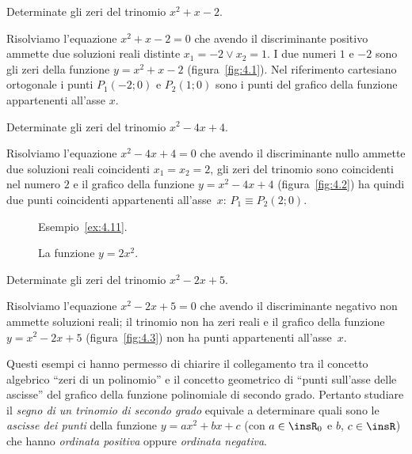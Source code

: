 \begin{exrig}
\begin{esempio}
\label{ex:4.9}
Determinate gli zeri del trinomio $x^2+x-2$.

Risolviamo l'equazione $x^2+x-2=0$ che avendo il discriminante positivo ammette due soluzioni reali distinte $x_1=-2\vee x_2=1$. I due numeri $1$ e $-2$ sono gli zeri della funzione $y=x^2+x-2$ (figura~\ref{fig:4.1}). Nel riferimento cartesiano ortogonale i punti $P_1(-2;0)$ e $P_2(1;0)$ sono i punti del grafico della funzione appartenenti all'asse $x$.
\end{esempio}

\begin{esempio}
\label{ex:4.10}
Determinate gli zeri del trinomio $x^2-4x+4$.

Risolviamo l'equazione $x^2-4x+4=0$ che avendo il discriminante nullo ammette due soluzioni reali coincidenti $x_1=x_2=2$, gli zeri del trinomio sono coincidenti nel numero $2$ e il grafico della funzione $y=x^2-4x+4$  (figura~\ref{fig:4.2}) ha quindi due punti coincidenti appartenenti all'asse~$x$: $P_1\equiv P_2(2;0)$.
\end{esempio}
\pagebreak
\begin{figure}[b]
 \begin{minipage}[t]{.45\textwidth}
\centering
 
\caption{Esempio~\ref{ex:4.11}.}\label{fig:4.3}
 \end{minipage}\hfil
 \begin{minipage}[t]{.45\textwidth}
\centering
 
\caption{La funzione $y=2x^2$.}\label{fig:4.4}
 \end{minipage}
\end{figure}

\begin{esempio}
\label{ex:4.11}
Determinate gli zeri del trinomio $x^2-2x+5$.

Risolviamo l'equazione $x^2-2x+5=0$ che avendo il discriminante negativo non ammette soluzioni reali; il trinomio non ha zeri reali e il grafico della funzione $y=x^2-2x+5$ (figura~\ref{fig:4.3}) non ha punti appartenenti all'asse~$x$.
\end{esempio}
\end{exrig}

Questi esempi ci hanno permesso di chiarire il collegamento tra il concetto algebrico ``zeri di un polinomio'' e il concetto geometrico di ``punti sull'asse delle ascisse'' del grafico della funzione polinomiale di secondo grado. Pertanto studiare il \emph{segno di un trinomio di secondo grado} equivale a determinare quali sono le \emph{ascisse dei punti} della funzione $y=ax^2+bx+c$ (con $a\in \insR_{0}$ e $b$, $c\in \insR$) che hanno \emph{ordinata positiva} oppure \emph{ordinata negativa}.

